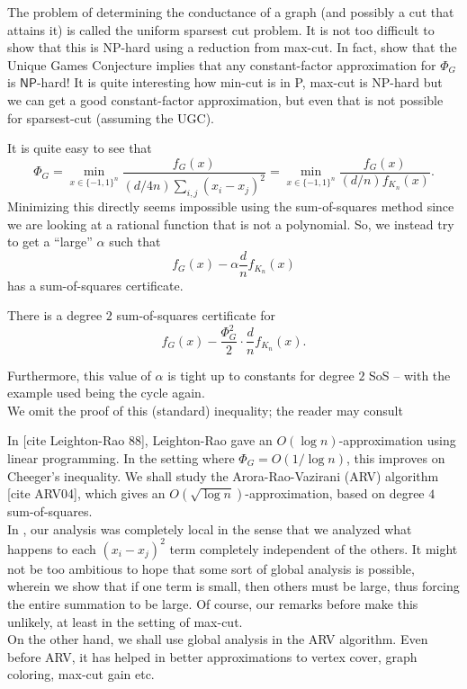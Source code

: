 	The problem of determining the conductance of a graph (and possibly a cut that attains it) is called the uniform sparsest cut problem. It is not too difficult to show that this is \textsf{NP}-hard using a reduction from max-cut. In fact, \cite{cond-appx-hard-ugc} show that the Unique Games Conjecture implies that any constant-factor approximation for $\Phi_G$ is $\mathsf{NP}$-hard! It is quite interesting how min-cut is in \textsf{P}, max-cut is \textsf{NP}-hard but we can get a good constant-factor approximation, but even that is not possible for sparsest-cut (assuming the UGC).

	It is quite easy to see that
	\[ \Phi_G = \min_{x \in \{-1,1\}^n} \frac{f_G(x)}{(d/4n) \sum_{i,j} (x_i - x_j)^2} = \min_{x \in \{-1,1\}^n} \frac{f_G(x)}{(d/n) f_{K_n}(x)}. \]
	Minimizing this directly seems impossible using the sum-of-squares method since we are looking at a rational function that is not a polynomial. So, we instead try to get a ``large'' $\alpha$ such that
	\[ f_G(x) - \alpha \frac{d}{n} f_{K_n}(x) \]
	has a sum-of-squares certificate.
	
	\begin{ftheo}
		\label{cheegers inequality}
		There is a degree $2$ sum-of-squares certificate for
		\[ f_G(x) - \frac{\Phi_G^2}{2} \cdot \frac{d}{n} f_{K_n}(x). \]
	\end{ftheo}
	Furthermore, this value of $\alpha$ is tight up to constants for degree $2$ SoS -- with the example used being the cycle again.\\
	We omit the proof of this (standard) inequality; the reader may consult 

	In [cite Leighton-Rao 88], Leighton-Rao gave an $O(\log n)$-approximation using linear programming. In the setting where $\Phi_G = O(1/\log n)$, this improves on Cheeger's inequality. We shall study the Arora-Rao-Vazirani (ARV) algorithm [cite ARV04], which gives an $O(\sqrt{\log n})$-approximation, based on degree $4$ sum-of-squares. \\
	In , our analysis was completely local in the sense that we analyzed what happens to each $(x_i - x_j)^2$ term completely independent of the others. It might not be too ambitious to hope that some sort of global analysis is possible, wherein we show that if one term is small, then others must be large, thus forcing the entire summation to be large. Of course, our remarks before  make this unlikely, at least in the setting of max-cut.\\
	On the other hand, we shall use global analysis in the ARV algorithm. Even before ARV, it has helped in better approximations to vertex cover, graph coloring, max-cut gain etc.

